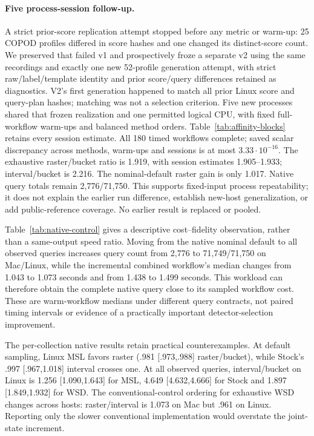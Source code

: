 \paragraph{Five process-session follow-up.}
A strict prior-score replication attempt stopped before any metric or warm-up:
25 COPOD profiles differed in score hashes and one changed its distinct-score
count. We preserved that failed v1 and prospectively froze a separate v2 using
the same recordings and exactly one new 52-profile generation attempt, with
strict raw/label/template identity and prior score/query differences retained
as diagnostics. V2's first generation happened to match all prior Linux score
and query-plan hashes; matching was not a selection criterion. Five new
processes shared that frozen realization and one permitted logical CPU,
with fixed full-workflow warm-ups and balanced method orders.
Table~\ref{tab:affinity-blocks} retains every session estimate. All 180 timed
workflows complete; saved scalar discrepancy across methods, warm-ups and
sessions is at most $3.33\cdot10^{-16}$. The exhaustive raster/bucket ratio
is 1.919, with session estimates 1.905--1.933; interval/bucket is 2.216.
The nominal-default raster gain is only 1.017. Native query totals remain
2,776/71,750. This supports fixed-input process repeatability; it does not
explain the earlier run difference, establish new-host generalization, or
add public-reference coverage. No earlier result is replaced or pooled.


Table~\ref{tab:native-control} gives a descriptive cost--fidelity observation, rather than a
same-output speed ratio. Moving from the native nominal default to all observed
queries increases query count from 2,776 to 71,749/71,750 on Mac/Linux, while
the incremental combined workflow's median changes from 1.043 to 1.073 seconds
and from 1.438 to 1.499 seconds. This workload can therefore obtain the complete
native query close to its sampled workflow cost. These are warm-workflow
medians under different query contracts, not paired timing intervals or evidence
of a practically important detector-selection improvement.

The per-collection native results retain practical counterexamples. At default
sampling, Linux MSL favors raster (.981 [.973,.988] raster/bucket), while
Stock's .997 [.967,1.018] interval crosses one. At all observed queries,
interval/bucket on Linux is 1.256 [1.090,1.643] for MSL,
4.649 [4.632,4.666] for Stock and 1.897 [1.849,1.932] for WSD.
The conventional-control ordering for exhaustive WSD changes across hosts:
raster/interval is 1.073 on Mac but .961 on Linux. Reporting only the
slower conventional implementation would overstate the joint-state increment.
